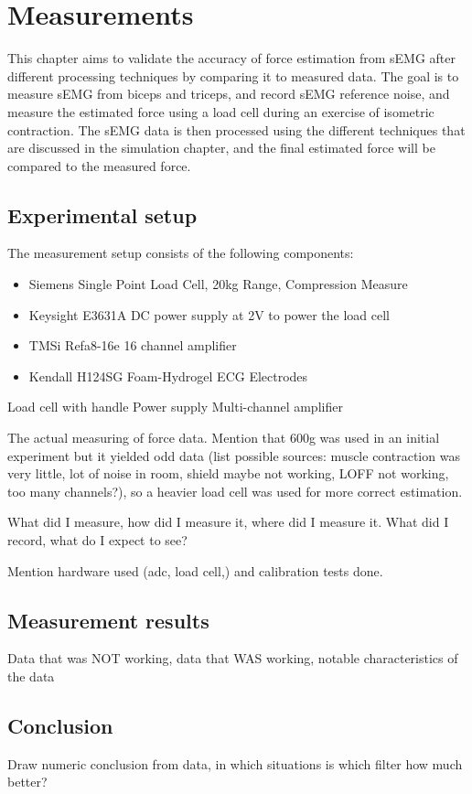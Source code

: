 \chapter{Measurements}
This chapter aims to validate the accuracy of force estimation from sEMG after different processing techniques by comparing it to measured data. The goal is to measure sEMG from biceps and triceps, and record sEMG reference noise, and measure the estimated force using a load cell during an exercise of isometric contraction. The sEMG data is then processed using the different techniques that are discussed in the simulation chapter, and the final estimated force will be compared to the measured force. 

\section{Experimental setup}
The measurement setup consists of the following components:
\begin{itemize}
    \item Siemens Single Point Load Cell, 20kg Range, Compression Measure
    \item Keysight E3631A DC power supply at 2V to power the load cell
    \item TMSi Refa8-16e 16 channel amplifier
    \item Kendall H124SG Foam-Hydrogel ECG Electrodes 
\end{itemize}


Load cell with handle
Power supply
Multi-channel amplifier




The actual measuring of force data. Mention that 600g was used in an initial experiment but it yielded odd data (list possible sources: muscle contraction was very little, lot of noise in room, shield maybe not working, LOFF not working, too many channels?), so a heavier load cell was used for more correct estimation.

What did I measure, how did I measure it, where did I measure it. What did I record, what do I expect to see?

Mention hardware used (adc, load cell,) and calibration tests done.
\section{Measurement results}
Data that was NOT working, data that WAS working, notable characteristics of the data


\section{Conclusion}
Draw numeric conclusion from data, in which situations is which filter how much better?